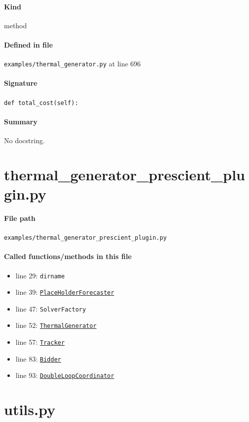 \documentclass[11pt]{report}
\begin{document}
\paragraph{Kind} method
\paragraph{Defined in file} \texttt{examples/thermal\_generator.py} at line 696
\paragraph{Signature} \texttt{def total\_cost(self):}
\paragraph{Summary} No docstring.

\section{thermal\_generator\_prescient\_plugin.py}
\label{file:examples-thermal_generator_prescient_plugin.py}
\paragraph{File path} \texttt{examples/thermal\_generator\_prescient\_plugin.py}
\paragraph{Called functions/methods in this file}
\begin{itemize}[leftmargin=*]
  \item line 29: \texttt{dirname}
  \item line 39: \hyperref[def:forecaster.py:PlaceHolderForecaster:L135]{\texttt{PlaceHolderForecaster}}
  \item line 47: \texttt{SolverFactory}
  \item line 52: \hyperref[def:examples-thermal_generator.py:ThermalGenerator:L26]{\texttt{ThermalGenerator}}
  \item line 57: \hyperref[def:tracker.py:Tracker:L19]{\texttt{Tracker}}
  \item line 83: \hyperref[def:bidder.py:Bidder:L1000]{\texttt{Bidder}}
  \item line 93: \hyperref[def:coordinator.py:DoubleLoopCoordinator:L30]{\texttt{DoubleLoopCoordinator}}
\end{itemize}

\section{utils.py}
\label{file:examples-utils.py}
\end{document}
